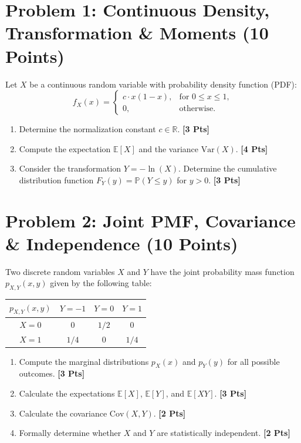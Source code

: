 \documentclass[11pt,a4paper]{article}
\begin{document}
\section*{Problem 1: Continuous Density, Transformation \& Moments \hfill (10 Points)}
Let $X$ be a continuous random variable with probability density function (PDF):
\[
f_X(x) = \begin{cases} c \cdot x(1-x), & \text{for } 0 \le x \le 1, \\ 0, & \text{otherwise.} \end{cases}
\]
\begin{enumerate}[label=(\alph*), itemsep=4pt]
    \item Determine the normalization constant $c \in \mathbb{R}$. \hfill \textbf{[3 Pts]}
    \item Compute the expectation $\mathbb{E}[X]$ and the variance $\text{Var}(X)$. \hfill \textbf{[4 Pts]}
    \item Consider the transformation $Y = -\ln(X)$. Determine the cumulative distribution function $F_Y(y) = \mathbb{P}(Y \le y)$ for $y > 0$. \hfill \textbf{[3 Pts]}
\end{enumerate}

\vspace{0.4cm}

\section*{Problem 2: Joint PMF, Covariance \& Independence \hfill (10 Points)}
Two discrete random variables $X$ and $Y$ have the joint probability mass function $p_{X,Y}(x, y)$ given by the following table:

\begin{center}
\renewcommand{\arraystretch}{1.3}
\begin{tabular}{c|ccc}
\toprule
$p_{X,Y}(x,y)$ & $Y = -1$ & $Y = 0$ & $Y = 1$ \\
\midrule
$X = 0$ & $0$ & $1/2$ & $0$ \\
$X = 1$ & $1/4$ & $0$ & $1/4$ \\
\bottomrule
\end{tabular}
\end{center}

\begin{enumerate}[label=(\alph*), itemsep=4pt]
    \item Compute the marginal distributions $p_X(x)$ and $p_Y(y)$ for all possible outcomes. \hfill \textbf{[3 Pts]}
    \item Calculate the expectations $\mathbb{E}[X]$, $\mathbb{E}[Y]$, and $\mathbb{E}[XY]$. \hfill \textbf{[3 Pts]}
    \item Calculate the covariance $\text{Cov}(X, Y)$. \hfill \textbf{[2 Pts]}
    \item Formally determine whether $X$ and $Y$ are statistically independent. \hfill \textbf{[2 Pts]}
\end{enumerate}
\end{document}
